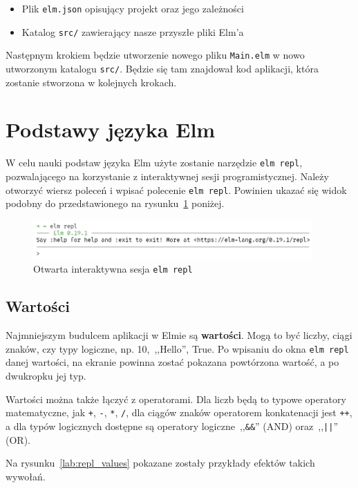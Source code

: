 \documentclass[twoside,a4paper]{report}
\begin{document}
\begin{itemize}[noitemsep,topsep=0pt]
    \item{Plik \texttt{elm.json} opisujący projekt oraz jego zależności}
    \item{Katalog \texttt{src/} zawierający nasze przyszłe pliki Elm'a}
\end{itemize}

Następnym krokiem będzie utworzenie nowego pliku \texttt{Main.elm} w nowo utworzonym katalogu \texttt{src/}.
Będzie się tam znajdował kod aplikacji, która zostanie stworzona w kolejnych krokach.

\section*{Podstawy języka Elm}
W celu nauki podstaw języka Elm użyte zostanie narzędzie \texttt{elm repl}, pozwalającego na korzystanie z interaktywnej sesji programistycznej.
Należy otworzyć wiersz poleceń i wpisać polecenie \texttt{elm repl}.
Powinien ukazać się widok podobny do przedstawionego na rysunku~\ref{lab:elm_repl_output} poniżej.

\begin{figure}[H]
    \centering
    \includegraphics[width=0.95\textwidth]{img/elm_repl_output.png}
    \caption{Otwarta interaktywna sesja \texttt{elm repl}}\label{lab:elm_repl_output}
\end{figure}

\subsection*{Wartości}
Najmniejszym budulcem aplikacji w Elmie są \textbf{wartości}.
Mogą to być liczby, ciągi znaków, czy typy logiczne, np. 10,~,,Hello'', True.
Po wpisaniu do okna \texttt{elm repl} danej wartości, na ekranie powinna zostać pokazana powtórzona wartość, a po dwukropku jej typ.

Wartości można także łączyć z operatorami.
Dla liczb będą to typowe operatory matematyczne, jak \texttt{+}, \texttt{-}, \texttt{*}, \texttt{/}, dla ciągów znaków operatorem konkatenacji jest \texttt{++}, a dla typów logicznych dostępne są operatory logiczne~,,\texttt{\&\&}'' (AND) oraz~,,\texttt{||}'' (OR).

Na rysunku~\ref{lab:repl_values} pokazane zostały przykłady efektów takich wywołań.
\end{document}
